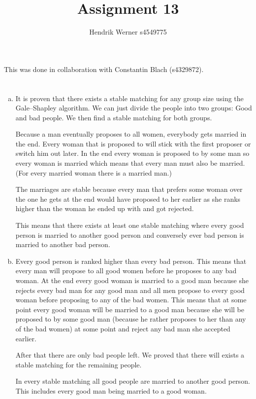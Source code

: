 \documentclass[12pt, a4paper]{article}
\title{Assignment 13}
\author{Hendrik Werner s4549775}
\begin{document}
\maketitle

This was done in collaboration with Constantin Blach (s4329872).

\section{} %
\begin{enumerate}[(a)]
	\item %
	It is proven that there exists a stable matching for any group size using the Gale–Shapley algorithm. We can just divide the people into two groups: Good and bad people. We then find a stable matching for both groups.

	Because a man eventually proposes to all women, everybody gets married in the end. Every woman that is proposed to will stick with the first proposer or switch him out later. In the end every woman is proposed to by some man so every woman is married which means that every man must also be married. (For every married woman there is a married man.)

	The marriages are stable because every man that prefers some woman over the one he gets at the end would have proposed to her earlier as she ranks higher than the woman he ended up with and got rejected.

	This means that there exists at least one stable matching where every good person is married to another good person and conversely ever bad person is married to another bad person.

	\item %
	Every good person is ranked higher than every bad person. This means that every man will propose to all good women before he proposes to any bad woman. At the end every good woman is married to a good man because she rejects every bad man for any good man and all men propose to every good woman before proposing to any of the bad women. This means that at some point every good woman will be married to a good man because she will be proposed to by some good man (because he rather proposes to her than any of the bad women) at some point and reject any bad man she accepted earlier.

	After that there are only bad people left. We proved that there will exists a stable matching for the remaining people.

	In every stable matching all good people are married to another good person. This includes every good man being married to a good woman.
\end{enumerate}
\end{document}

